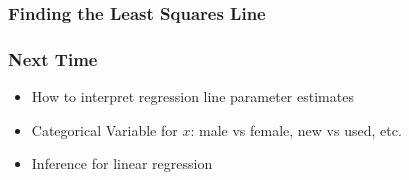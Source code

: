 \documentclass[handout]{beamer}
\newcommand{\blue}[1]{\textcolor{blue2}{#1}}
\newcommand{\xbar}{\overline{x}}
\newcommand{\ybar}{\overline{y}}
\begin{document}
\begin{frame}[fragile]
\frametitle{Finding the Least Squares Line}
%
%
% 
%
%
%

\end{frame}


\begin{frame}[fragile]
\frametitle{Next Time}

\begin{itemize}
\item How to interpret regression line parameter estimates
\item Categorical Variable for $x$:  male vs female, new vs used, etc.
\item Inference for linear regression
\end{itemize}

\end{frame}
\end{document}
